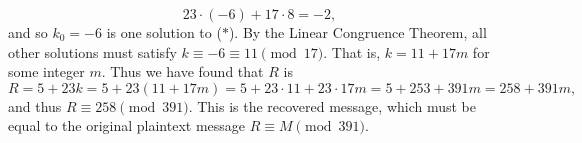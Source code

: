 \documentclass[11pt]{article}
\theoremstyle{plain}
\theoremstyle{definition}
\begin{document}
\begin{enumerate}
\begin{Solution}
\begin{enumerate}
\[
 23\cdot(-6) + 17\cdot 8 = -2,
\]
and so $k_0=-6$ is one solution to ($\ast$). By the Linear Congruence Theorem, all other solutions must satisfy $k\equiv -6\equiv 11\pmod{17}.$ That is, $k=11+17m$ for some integer $m$. Thus we have found that $R$ is
\[
 R = 5+23k = 5+23(11+17m) = 5 + 23\cdot 11 + 23\cdot 17m = 5 + 253 + 391m = 258 + 391m ,
\]
and thus $R \equiv 258\pmod{391}$. This is the recovered message, which must be equal to the original plaintext message $R\equiv M\pmod{391}$. 
\end{enumerate}
\end{Solution}




\end{enumerate}
\end{document}

